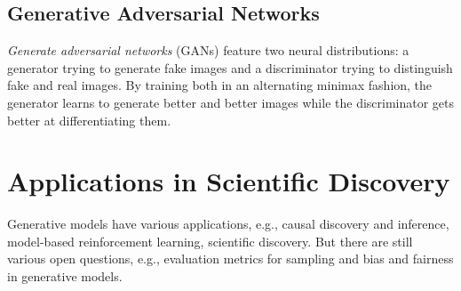 		\subsection{Generative Adversarial Networks}
			\emph{Generate adversarial networks} (GANs) feature two neural distributions: a generator trying to generate fake images and a discriminator trying to distinguish fake and real images. By training both in an alternating minimax fashion, the generator learns to generate better and better images while the discriminator gets better at differentiating them.

	\section{Applications in Scientific Discovery}
		Generative models have various applications, e.g., causal discovery and inference, model-based reinforcement learning, scientific discovery. But there are still various open questions, e.g., evaluation metrics for sampling and bias and fairness in generative models.
